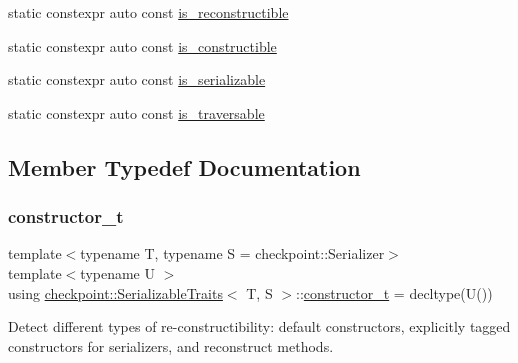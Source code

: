 \begin{DoxyCompactItemize}
static constexpr auto const \hyperlink{structcheckpoint_1_1_serializable_traits_a6cc78a7cc9b4645727c92437619fce83}{is\+\_\+reconstructible}
\item 
static constexpr auto const \hyperlink{structcheckpoint_1_1_serializable_traits_a7720e2f57d1b3d2f87fd022b47d0b775}{is\+\_\+constructible}
\item 
static constexpr auto const \hyperlink{structcheckpoint_1_1_serializable_traits_a3941c4fcb5397fe564a3453857aa9183}{is\+\_\+serializable}
\item 
static constexpr auto const \hyperlink{structcheckpoint_1_1_serializable_traits_a426639501cd0ce23cb14c7b2ff982fc1}{is\+\_\+traversable}
\end{DoxyCompactItemize}


\subsection{Member Typedef Documentation}
\mbox{\label{structcheckpoint_1_1_serializable_traits_aa0430155930461d346b90681db234d84}} 
\subsubsection{\texorpdfstring{constructor\+\_\+t}{constructor\_t}}
{\footnotesize\ttfamily template$<$typename T, typename S = checkpoint\+::\+Serializer$>$ \\
template$<$typename U $>$ \\
using \hyperlink{structcheckpoint_1_1_serializable_traits}{checkpoint\+::\+Serializable\+Traits}$<$ T, S $>$\+::\hyperlink{structcheckpoint_1_1_serializable_traits_aa0430155930461d346b90681db234d84}{constructor\+\_\+t} =  decltype(U())}

Detect different types of re-\/constructibility\+: default constructors, explicitly tagged constructors for serializers, and reconstruct methods. \mbox{\label{structcheckpoint_1_1_serializable_traits_a8e42305be1264b105f525ae7dff36c15}} 
